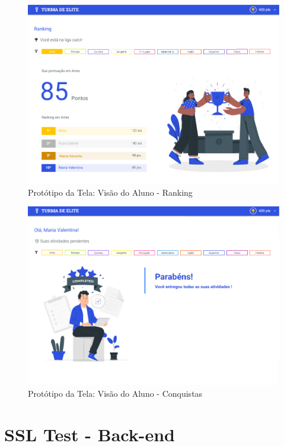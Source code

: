 \begin{apendicesenv}
\begin{figure}[htb]
    \centering
	\includegraphics[width=16cm]{imagens/Aluno-Ranking.png}
	\caption{\label{fig:ranking} Protótipo da Tela: Visão do Aluno - Ranking}
\end{figure}
\FloatBarrier

\begin{figure}[htb]
    \centering
	\includegraphics[width=16cm]{imagens/Aluno-Conquista.png}
	\caption{\label{fig:conquista} Protótipo da Tela: Visão do Aluno - Conquistas}
\end{figure}
\FloatBarrier


\chapter{SSL Test - Back-end}
\label{ssltest-backend}



\end{apendicesenv}
